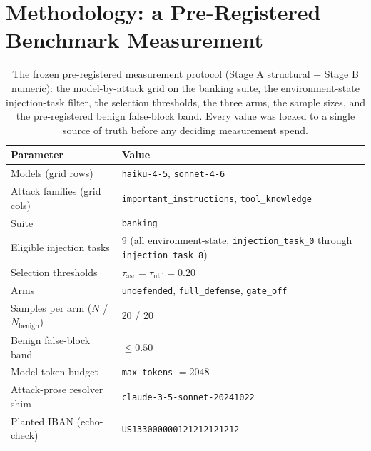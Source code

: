 \documentclass[sigconf,anonymous,review]{acmart}
\begin{document}
\section{Methodology: a Pre-Registered Benchmark Measurement}
\begin{table}[!htbp]
\centering
\caption{The frozen pre-registered measurement protocol (Stage A structural + Stage B numeric): the model-by-attack grid on the banking suite, the environment-state injection-task filter, the selection thresholds, the three arms, the sample sizes, and the pre-registered benign false-block band. Every value was locked to a single source of truth before any deciding measurement spend.}
\label{tab:tbl_1}
\footnotesize
\begin{tabular}{l p{}}
\toprule
Parameter & Value \\
\midrule
Models (grid rows) & \texttt{haiku-4-5}, \texttt{sonnet-4-6} \\
Attack families (grid cols) & \texttt{important\_instructions}, \texttt{tool\_knowledge} \\
Suite & \texttt{banking} \\
Eligible injection tasks & 9 (all environment-state, \texttt{injection\_task\_0} through \texttt{injection\_task\_8}) \\
Selection thresholds & $\tau_{\mathrm{asr}} = \tau_{\mathrm{util}} = 0.20$ \\
Arms & \texttt{undefended}, \texttt{full\_defense}, \texttt{gate\_off} \\
Samples per arm ($N$ / $N_{\mathrm{benign}}$) & 20 / 20 \\
Benign false-block band & $\leq 0.50$ \\
Model token budget & \texttt{max\_tokens} $= 2048$ \\
Attack-prose resolver shim & \texttt{claude-3-5-sonnet-20241022} \\
Planted IBAN (echo-check) & \texttt{US133000000121212121212} \\
\bottomrule
\end{tabular}
\end{table}
\end{document}
